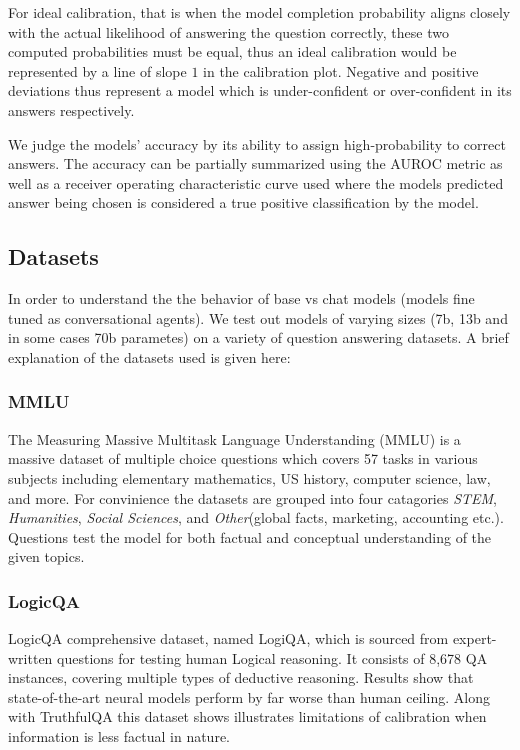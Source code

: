 \documentclass[11pt]{article}
\begin{document}
For ideal calibration, that is when the 
model completion probability aligns closely with the actual 
likelihood of answering the question correctly, these 
two computed probabilities must be equal, thus an 
ideal calibration would be represented  by a line of 
slope $1$ in the calibration plot. 
Negative and positive deviations thus represent a model 
which is under-confident  or over-confident  in its answers respectively.

We judge the models' accuracy by its ability to assign high-probability to correct answers. The accuracy can be partially summarized using the AUROC metric as well as a 
receiver operating characteristic curve used where the models
predicted answer being chosen is considered a true positive classification by the model.


\subsection{Datasets}

In order to understand the the behavior of 
base vs chat models (models fine tuned as conversational agents). We test out models of varying sizes (7b, 13b and in some cases 70b parametes) on a variety of question answering datasets. A brief explanation of the datasets used is given here:

\subsubsection{MMLU}

The Measuring Massive Multitask Language Understanding (MMLU) 
\cite{hendrycks2021measuring} is a massive dataset of multiple choice questions which covers 57 tasks in various subjects including elementary mathematics, US history, computer science, law, and more. For convinience the datasets are grouped into 
four catagories \emph{STEM},  \emph{Humanities}, \emph{Social Sciences}, and \emph{Other}(global facts, marketing, accounting etc.). Questions test the model for both factual and conceptual understanding of the given topics.

\subsubsection{LogicQA}

LogicQA comprehensive dataset, named LogiQA, which is sourced from expert-written questions for testing human Logical reasoning. It consists of 8,678 QA instances, covering multiple types of deductive reasoning. Results show that state-of-the-art neural models perform by far worse than human ceiling. Along with TruthfulQA this dataset shows illustrates limitations of calibration when information is less factual in nature.
\end{document}
